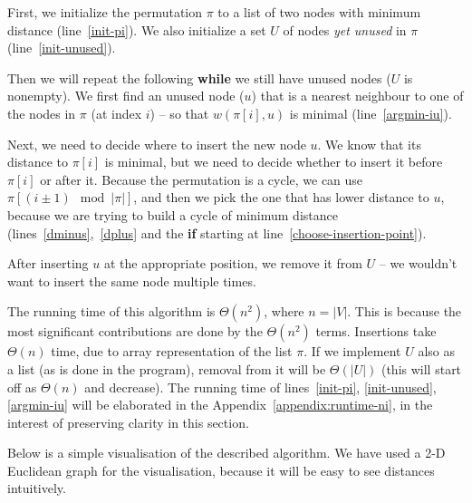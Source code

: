\documentclass{article}
\newcommand{\bb}[1]{\textbf{#1}}
\newcommand{\ii}[1]{\textit{#1}}
\begin{document}
First, we initialize the permutation $\pi$ to a list of two nodes with minimum distance
(line~\ref*{init-pi}). We also initialize a set $U$ of nodes \ii{yet unused} in $\pi$
(line~\ref*{init-unused}).

Then we will repeat the following \bb{while} we still have unused nodes ($U$ is nonempty).
We first find an unused node ($u$) that is a nearest neighbour to one of the nodes
in $\pi$ (at index $i$) -- so that $w(\pi[i], u)$ is minimal (line~\ref*{argmin-iu}).

Next, we need to decide where to insert the new node $u$. We know that its distance to
$\pi[i]$ is minimal, but we need to decide whether to insert it before $\pi[i]$ or
after it. Because the permutation is a cycle, we can use $\pi[(i\pm 1)\mod |\pi|]$,
and then we pick the one that has lower distance to $u$, because we are trying to
build a cycle of minimum distance (lines~\ref*{dminus},~\ref*{dplus} and the \bb{if}
starting at line~\ref*{choose-insertion-point}).

After inserting $u$ at the appropriate position, we remove it from $U$ -- we wouldn't want
to insert the same node multiple times.

The running time of this algorithm is $\Theta(n^2)$, where $n=|V|$. This is because
the most significant contributions are done by the $\Theta(n^2)$ terms. Insertions
take $\Theta(n)$ time, due to array representation of the list $\pi$.
If we implement $U$ also as a list (as is done in the program), removal from it
will be $\Theta(|U|)$ (this will start off as $\Theta(n)$ and decrease). The running
time of lines~\ref*{init-pi}, \ref*{init-unused}, \ref*{argmin-iu} will be elaborated
in the Appendix~\ref{appendix:runtime-ni}, in the interest of preserving clarity
in this section.

Below is a simple visualisation of the described algorithm. We have used a 2-D
Euclidean graph for the visualisation, because it will be easy to see distances
intuitively.
\\
\end{document}
